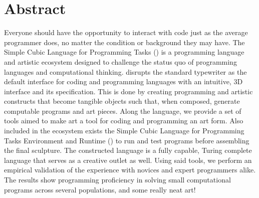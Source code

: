 
\chapter{Abstract}

Everyone should have the opportunity to interact with code just as the average programmer does, no matter the condition or background they may have.
The Simple Cubic Language for Programming Tasks (\sculpt) is a programming language and artistic ecosystem designed to challenge the status quo of programming languages and computational thinking.
\sculpt disrupts the standard typewriter as the default interface for coding and programming languages with an intuitive, 3D interface and its specification.
This is done by creating programming and artistic constructs that become tangible objects such that, when composed, generate computable programs and art pieces.
Along the language, we provide a set of tools aimed to make art a tool for coding and programming an art form.
Also included in the ecosystem exists the Simple Cubic Language for Programming Tasks Environment and Runtime (\sculpter) to run and test programs before assembling the final sculpture.
The constructed language is a fully capable, Turing complete language that serves as a creative outlet as well.
Using said tools, we perform an empirical validation of the experience with novices and expert programmers alike.
The results show programming proficiency in solving small computational programs across several populations, and some really neat art!

\endinput

